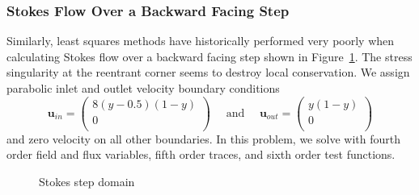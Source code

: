 \documentclass[letterpaper]{article}
\newcommand{\bfu}{\boldsymbol u}
\def\vecttwo#1#2{\left(
\begin{array}{c}
#1\\
#2\\
\end{array}
\right)}
\begin{document}
\subsubsection{Stokes Flow Over a Backward Facing Step}\label{sec:stokesStep}
Similarly, least squares methods have historically performed very poorly when
calculating Stokes flow over a backward facing step shown in
Figure~\ref{fig:stokesStepDomain}. The stress singularity at
the reentrant corner seems to destroy local conservation. We
assign parabolic inlet and outlet velocity boundary conditions
\[
\bfu_{in}=\vecttwo{8(y-0.5)(1-y)}{0}
\quad\text{ and }\quad
\bfu_{out}=\vecttwo{y(1-y)}{0}
\]
and zero velocity on all other boundaries. In this problem, we solve with
fourth order field and flux variables, fifth order traces, and sixth order
test functions.

\begin{figure}[!h]
\centering
{}
\caption{Stokes step domain}
\label{fig:stokesStepDomain}
\end{figure}
\end{document}

